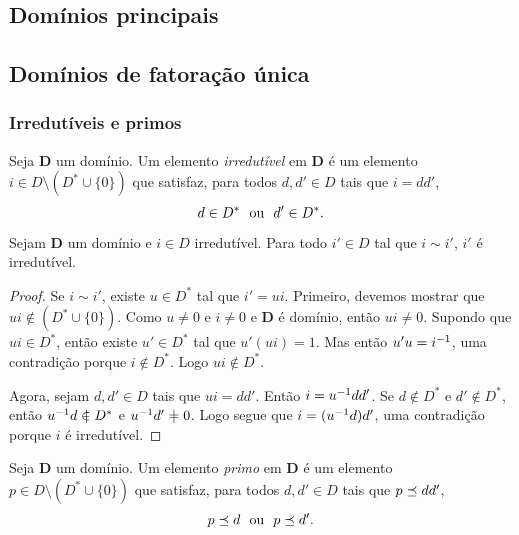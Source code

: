 \subsection{Domínios principais}

\subsection{Domínios de fatoração única}

\subsubsection{Irredutíveis e primos}

\begin{definition}
Seja $\bm D$ um domínio. Um elemento \emph{irredutível} em $\bm D$ é um elemento $i \in D \setminus (D^* \cup \{0\})$ que satisfaz, para todos $d,d' \in D$ tais que $i=dd'$,
		\begin{equation*}
		d \in D^* \text{\ \ ou\ \ } d' \in D^*.
		\end{equation*}
\end{definition}

\begin{proposition}
Sejam $\bm D$ um domínio e $i \in D$ irredutível. Para todo $i' \in D$ tal que $i \sim i'$, $i'$ é irredutível.
\end{proposition}
\begin{proof}
Se $i \sim i'$, existe $u\in D^*$ tal que $i'=ui$. Primeiro, devemos mostrar que $ui \notin (D^* \cup \{0\})$. Como $u \neq 0$ e $i \neq 0$ e $\bm D$ é domínio, então $ui \neq 0$. Supondo que $ui \in D^*$, então existe $u' \in D^*$ tal que $u'(ui)=1$. Mas então $u'u=i^{-1}$, uma contradição porque $i \notin D^*$. Logo $ui \notin D^*$.
	
Agora, sejam $d,d' \in D$ tais que $ui=dd'$. Então $i=u^{-1} dd'$. Se $d \notin D^*$ e $d' \notin D^*$, então $u\inv d \notin D^*$ e $u\inv d' \neq 0$. Logo segue que $i=(u^{-1} d)d'$, uma contradição porque $i$ é irredutível.
\end{proof}

\begin{definition}
Seja $\bm D$ um domínio. Um elemento \emph{primo} em $\bm D$ é um elemento $p \in D\setminus (D^* \cup \{0\})$ que satisfaz, para todos $d,d' \in D$ tais que $p \preceq dd'$,
		\begin{equation*}
		p \preceq d \text{\ \ ou\ \ } p \preceq d'.
		\end{equation*}
\end{definition}

